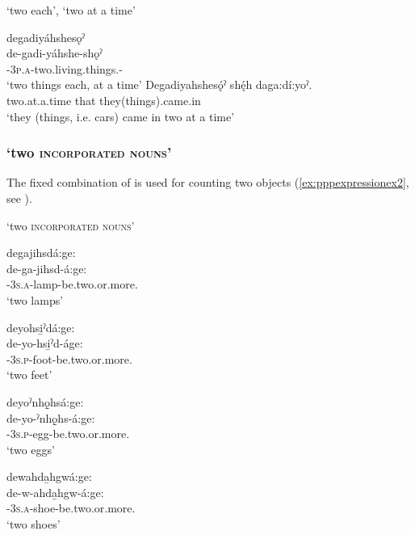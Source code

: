 \ea\label{ex:eachperex4}  ‘two each’, ‘two at a time’

\ea degadiyáhshesǫˀ\\
\gll de-gadi-yáhshe-shǫˀ\\
\textsc{\dualic-3p.a}-two.living.things.\textsc{\stative-\pluralizer}\\
\glt `two things each, at a time'
\ex
\gll Degadiyahshesǫ́ˀ shę́h daga:dí:yoˀ.\\
two.at.a.time that they(things).came.in\\
\glt ‘they (things, i.e. cars) came in two at a time’ 
\z
\z 


\subsubsection*{ ‘two \textsc{incorporated nouns}’} \label{[de+pronominal prefix+incorporated noun+age:]}
The fixed combination of  is used for counting two objects (\ref{ex:pppexpressionex2}, see ).  

\ea\label{ex:pppexpressionex2}  ‘two \textsc{incorporated nouns}’

\ea degajihsdá:ge:\\
\gll de-ga-jihsd-á:ge:\\
{\dualic}-\textsc{3s.a}-lamp-be.two.or.more.{\stative}\\
\glt `two lamps'

\ex deyohsi̱ˀdá:ge:\\
\gll de-yo-hsi̱ˀd-áge:\\
{\dualic}-\textsc{3s.p}-foot-be.two.or.more.{\stative}\\
\glt `two feet'

\ex deyoˀnhǫ̱hsá:ge:\\
\gll de-yo-ˀnhǫ̱hs-á:ge:\\
{\dualic}-\textsc{3s.p}-egg-be.two.or.more.{\stative}\\
\glt `two eggs'

\ex dewahda̱hgwá:ge:\\
\gll de-w-ahda̱hgw-á:ge:\\
{\dualic}-\textsc{3s.a}-shoe-be.two.or.more.{\stative}\\
\glt `two shoes'
\z
\z


